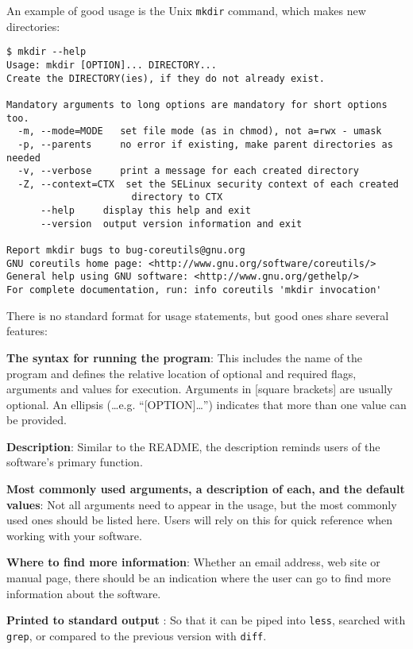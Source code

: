 \documentclass[10pt]{article}
\begin{document}
An example of good usage is the Unix \texttt{mkdir} command, which makes
new directories:

\begin{small}
\begin{verbatim}
$ mkdir --help
Usage: mkdir [OPTION]... DIRECTORY...
Create the DIRECTORY(ies), if they do not already exist.

Mandatory arguments to long options are mandatory for short options too.
  -m, --mode=MODE   set file mode (as in chmod), not a=rwx - umask
  -p, --parents     no error if existing, make parent directories as needed
  -v, --verbose     print a message for each created directory
  -Z, --context=CTX  set the SELinux security context of each created
                      directory to CTX
      --help     display this help and exit
      --version  output version information and exit

Report mkdir bugs to bug-coreutils@gnu.org
GNU coreutils home page: <http://www.gnu.org/software/coreutils/>
General help using GNU software: <http://www.gnu.org/gethelp/>
For complete documentation, run: info coreutils 'mkdir invocation'
\end{verbatim}
\end{small}

There is no standard format for usage statements, but good ones share
several features:

\textbf{The syntax for running the program}: This includes the name of the
program and defines the relative
location of optional and required flags, arguments and values for execution.
Arguments in {[}square brackets{]}
are usually optional. An ellipsis (\ldots e.g. ``{[}OPTION{]}\ldots{}'')
indicates that more than one value can be provided.

\textbf{Description}: Similar to the README, the
description reminds users of the software's primary function.

\textbf{Most commonly used arguments, a description of each, and the
default values}: Not all arguments need to appear in the usage, but the most
commonly used ones should be listed here. Users will rely on this for
quick reference when working with your software.

\textbf{Where to find more information}: Whether an email address, web
site or manual page, there should be an indication where the user can go
to find more information about the software.

\textbf{Printed to standard output} : So that it can be piped into
\texttt{less}, searched with \texttt{grep}, or compared to the previous
version with \texttt{diff}.
\end{document}
